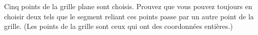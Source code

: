 Cinq points de la grille plane sont choisis. Prouvez que vous pouvez
toujours en choisir deux tels que le segment reliant ces points passe par un
autre point de la grille. (Les points de la grille sont ceux qui ont des
coordonnées entières.)
